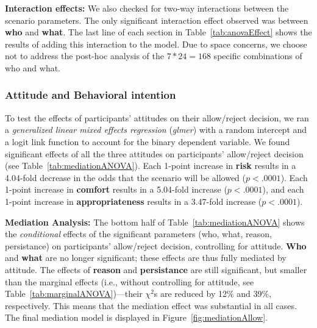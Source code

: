 \textbf{Interaction effects: }
We also checked for two-way interactions between the scenario parameters. The only significant interaction effect observed was between \textbf{who} and \textbf{what}. The last line of each section in Table~\ref{tab:anovaEffect} shows the results of adding this interaction to the model. Due to space concerns, we choose not to address the post-hoc analysis of the $7 * 24 = 168$ specific combinations of who and what.

\subsubsection{Attitude and Behavioral intention}
To test the effects of participants' attitudes on their allow/reject decision, we ran a \emph{generalized linear mixed effects regression} (\emph{glmer}) with a random intercept and a logit link function to account for the binary dependent variable.
We found significant effects of all the three attitudes on participants' allow/reject decision (see Table~\ref{tab:mediationANOVA}). Each 1-point increase in \textbf{risk} results in a 4.04-fold decrease in the odds that the scenario will be allowed ($p < .0001$). Each 1-point increase in \textbf{comfort} results in a 5.04-fold increase ($p < .0001$), and each 1-point increase in \textbf{appropriateness} results in a 3.47-fold increase ($p < .0001$).

\textbf{Mediation Analysis: }
The bottom half of Table~\ref{tab:mediationANOVA} shows the \emph{conditional} effects of the significant parameters (who, what, reason, persistance) on participants' allow/reject decision, controlling for attitude. \textbf{Who} and \textbf{what} are no longer significant; these effects are thus fully mediated by attitude. The effects of \textbf{reason} and \textbf{persistance} are still significant, but smaller than the marginal effects (i.e., without controlling for attitude, see Table~\ref{tab:marginalANOVA})---their $\chi^2$s are reduced by 12\% and 39\%, respectively. This means that the mediation effect was substantial in all cases. The final mediation model is displayed in Figure~\ref{fig:mediationAllow}.


